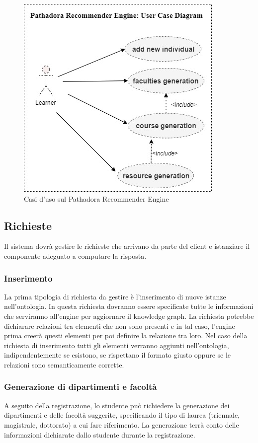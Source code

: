 \begin{figure}[H]
\centering
\includegraphics[scale=0.4]{res/pathadora-engine.jpg}
\caption{Casi d'uso sul Pathadora Recommender Engine}
\label{fig:pathadora-engine}
\end{figure}

\subsection{Richieste}
Il sistema dovrà gestire le richieste che arrivano da parte del client e istanziare il componente adeguato a computare la risposta.

\subsubsection{Inserimento}
La prima tipologia di richiesta da gestire è l’inserimento di nuove istanze nell'ontologia. In questa richiesta dovranno essere specificate tutte le informazioni che serviranno all’engine per aggiornare il knowledge graph. La richiesta potrebbe dichiarare relazioni tra elementi che non sono presenti e in tal caso, l’engine prima creerà questi elementi per poi definire la relazione tra
loro. Nel caso della richiesta di inserimento tutti gli elementi verranno aggiunti nell’ontologia, indipendentemente se esistono, se rispettano il formato giusto oppure se le relazioni sono semanticamente corrette.

\subsubsection{Generazione di dipartimenti e facoltà}
A seguito della registrazione, lo studente può richiedere la generazione dei dipartimenti e delle facoltà suggerite, specificando il tipo di laurea (triennale, magistrale, dottorato) a cui fare riferimento. La generazione terrà conto delle informazioni dichiarate dallo studente durante la registrazione.

